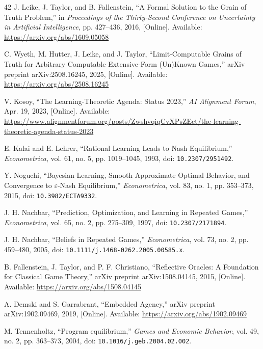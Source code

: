 \begin{thebibliography}{42}
J. Leike, J. Taylor, and B. Fallenstein, ``A Formal Solution to the Grain of Truth Problem,'' in \emph{Proceedings of the Thirty-Second Conference on Uncertainty in Artificial Intelligence}, pp. 427--436, 2016, [Online]. Available: \url{https://arxiv.org/abs/1609.05058}

C. Wyeth, M. Hutter, J. Leike, and J. Taylor, ``Limit-Computable Grains of Truth for Arbitrary Computable Extensive-Form (Un)Known Games,'' arXiv preprint arXiv:2508.16245, 2025, [Online]. Available: \url{https://arxiv.org/abs/2508.16245}

{\raggedright
V. Kosoy, ``The Learning-Theoretic Agenda: Status 2023,'' \emph{AI Alignment Forum}, Apr. 19, 2023, [Online]. Available: \url{https://www.alignmentforum.org/posts/ZwshvqiqCvXPsZEct/the-learning-theoretic-agenda-status-2023}\par}

E. Kalai and E. Lehrer, ``Rational Learning Leads to Nash Equilibrium,'' \emph{Econometrica}, vol. 61, no. 5, pp. 1019--1045, 1993, doi: \nolinkurl{10.2307/2951492}.

Y. Noguchi, ``Bayesian Learning, Smooth Approximate Optimal Behavior, and Convergence to $\varepsilon$-Nash Equilibrium,'' \emph{Econometrica}, vol. 83, no. 1, pp. 353--373, 2015, doi: \nolinkurl{10.3982/ECTA9332}.

J. H. Nachbar, ``Prediction, Optimization, and Learning in Repeated Games,'' \emph{Econometrica}, vol. 65, no. 2, pp. 275--309, 1997, doi: \nolinkurl{10.2307/2171894}.

J. H. Nachbar, ``Beliefs in Repeated Games,'' \emph{Econometrica}, vol. 73, no. 2, pp. 459--480, 2005, doi: \nolinkurl{10.1111/j.1468-0262.2005.00585.x}.

B. Fallenstein, J. Taylor, and P. F. Christiano, ``Reflective Oracles: A Foundation for Classical Game Theory,'' arXiv preprint arXiv:1508.04145, 2015, [Online]. Available: \url{https://arxiv.org/abs/1508.04145}

A. Demski and S. Garrabrant, ``Embedded Agency,'' arXiv preprint arXiv:1902.09469, 2019, [Online]. Available: \url{https://arxiv.org/abs/1902.09469}

M. Tennenholtz, ``Program equilibrium,'' \emph{Games and Economic Behavior}, vol. 49, no. 2, pp. 363--373, 2004, doi: \nolinkurl{10.1016/j.geb.2004.02.002}.


\end{thebibliography}
